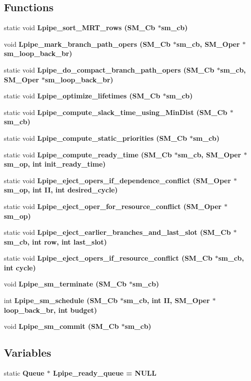 \subsection*{Functions}
\begin{CompactItemize}
\item 
static void \bf{Lpipe\_\-sort\_\-MRT\_\-rows} (\bf{SM\_\-Cb} $\ast$sm\_\-cb)
\item 
void \bf{Lpipe\_\-mark\_\-branch\_\-path\_\-opers} (\bf{SM\_\-Cb} $\ast$sm\_\-cb, \bf{SM\_\-Oper} $\ast$sm\_\-loop\_\-back\_\-br)
\item 
static void \bf{Lpipe\_\-do\_\-compact\_\-branch\_\-path\_\-opers} (\bf{SM\_\-Cb} $\ast$sm\_\-cb, \bf{SM\_\-Oper} $\ast$sm\_\-loop\_\-back\_\-br)
\item 
static void \bf{Lpipe\_\-optimize\_\-lifetimes} (\bf{SM\_\-Cb} $\ast$sm\_\-cb)
\item 
static void \bf{Lpipe\_\-compute\_\-slack\_\-time\_\-using\_\-Min\-Dist} (\bf{SM\_\-Cb} $\ast$sm\_\-cb)
\item 
static void \bf{Lpipe\_\-compute\_\-static\_\-priorities} (\bf{SM\_\-Cb} $\ast$sm\_\-cb)
\item 
static void \bf{Lpipe\_\-compute\_\-ready\_\-time} (\bf{SM\_\-Cb} $\ast$sm\_\-cb, \bf{SM\_\-Oper} $\ast$sm\_\-op, int init\_\-ready\_\-time)
\item 
static void \bf{Lpipe\_\-eject\_\-opers\_\-if\_\-dependence\_\-conflict} (\bf{SM\_\-Oper} $\ast$sm\_\-op, int II, int desired\_\-cycle)
\item 
static void \bf{Lpipe\_\-eject\_\-oper\_\-for\_\-resource\_\-conflict} (\bf{SM\_\-Oper} $\ast$sm\_\-op)
\item 
static void \bf{Lpipe\_\-eject\_\-earlier\_\-branches\_\-and\_\-last\_\-slot} (\bf{SM\_\-Cb} $\ast$sm\_\-cb, int row, int last\_\-slot)
\item 
static void \bf{Lpipe\_\-eject\_\-opers\_\-if\_\-resource\_\-conflict} (\bf{SM\_\-Cb} $\ast$sm\_\-cb, int cycle)
\item 
void \bf{Lpipe\_\-sm\_\-terminate} (\bf{SM\_\-Cb} $\ast$sm\_\-cb)
\item 
int \bf{Lpipe\_\-sm\_\-schedule} (\bf{SM\_\-Cb} $\ast$sm\_\-cb, int II, \bf{SM\_\-Oper} $\ast$loop\_\-back\_\-br, int budget)
\item 
void \bf{Lpipe\_\-sm\_\-commit} (\bf{SM\_\-Cb} $\ast$sm\_\-cb)
\end{CompactItemize}
\subsection*{Variables}
\begin{CompactItemize}
\item 
static \bf{Queue} $\ast$ \bf{Lpipe\_\-ready\_\-queue} = NULL
\end{CompactItemize}


